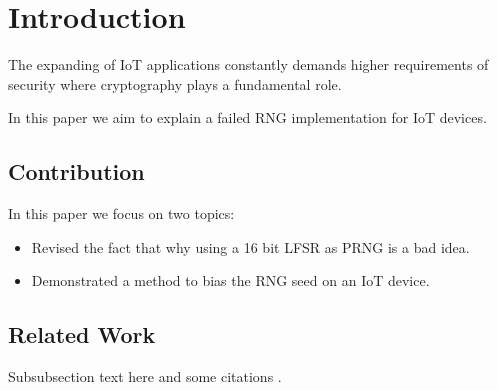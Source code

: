 \section{Introduction}
The expanding of IoT applications constantly demands higher requirements of security where cryptography plays a fundamental role.

In this paper we aim to explain a failed RNG implementation for IoT devices.

\subsection{Contribution}
In this paper we focus on two topics:
\begin{itemize}
\item Revised the fact that why using a 16 bit LFSR as PRNG is a bad idea.
\item Demonstrated a method to bias the RNG seed on an IoT device.
\end{itemize}

\subsection{Related Work}
Subsubsection text here and some citations \cite{IEEEexample:conf_typical} \cite{IEEEexample:articledualmonths}.